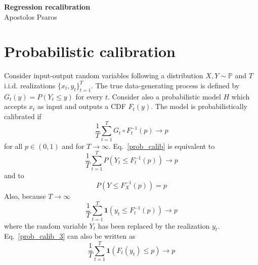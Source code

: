 

\newcommand{\bw}{\boldsymbol{w}}
\newcommand{\bp}{\boldsymbol{p}}
\newcommand{\bth}{\boldsymbol{\theta}}
\newcommand{\bA}{\boldsymbol{A}}
\newcommand{\cH}{\pazocal{H}}
\newcommand{\cN}{\pazocal{N}}
\newcommand{\cP}{\pazocal{P}}
\newcommand{\cD}{\pazocal{D}}
\newcommand{\cO}{\pazocal{O}}
\newcommand{\cL}{\pazocal{L}}


\setcounter{tocdepth}{3}

	
	\sloppy
	
	\begin{center}	
		\Large
		\textbf{Regression recalibration}\\
		\large
		Apostolos Psaros\\	
	\end{center}
	\vskip 0.25in
	


\section{Probabilistic calibration}
Consider input-output random variables following a distribution $X, Y \sim \mathbb{P}$ and $T$ i.i.d. realizations $\{x_t, y_t\}_{t=1}^T$. 
The true data-generating process is defined by $G_t(y) = P(Y_t \leq y)$ for every $t$.
Consider also a probabilistic model $H$ which accepts $x_t$ as input and outputs a CDF $F_t(y)$. 
The model is probabilistically calibrated if
\begin{equation}\label{prob_calib}
	\frac{1}{T}\sum_{t=1}^{T}G_t\circ F_t^{-1}(p)\to p
\end{equation}
for all $p\in(0,1)$ and for $T \to \infty$.
Eq.~\eqref{prob_calib} is equivalent to
\begin{equation}\label{prob_calib_2}
\frac{1}{T}\sum_{t=1}^{T}P(Y_t \leq F_t^{-1}(p))\to p
\end{equation}
and to 
\begin{equation}\label{prob}
P(Y \leq F_X^{-1}(p)) =  p
\end{equation}
Also, because $T \to \infty$
\begin{equation}\label{prob_calib_3}
\frac{1}{T}\sum_{t=1}^{T}\boldsymbol{1}(y_t \leq F_t^{-1}(p))\to p
\end{equation}
where the random variable $Y_t$ has been replaced by the realization $y_t$. 
Eq.~\eqref{prob_calib_3} can also be written as
\begin{equation}\label{prob_calib_4}
\frac{1}{T}\sum_{t=1}^{T}\boldsymbol{1}(F_t(y_t) \leq p)\to p
\end{equation}

